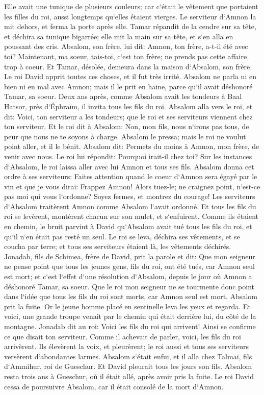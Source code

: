 \verse Elle avait une tunique de plusieurs couleurs; car c`était le vêtement que portaient les filles du roi, aussi longtemps qu`elles étaient vierges. Le serviteur d`Amnon la mit dehors, et ferma la porte après elle. 
\verse Tamar répandit de la cendre sur sa tête, et déchira sa tunique bigarrée; elle mit la main sur sa tête, et s`en alla en poussant des cris. 
\verse Absalom, son frère, lui dit: Amnon, ton frère, a-t-il été avec toi? Maintenant, ma soeur, tais-toi, c`est ton frère; ne prends pas cette affaire trop à coeur. Et Tamar, désolée, demeura dans la maison d`Absalom, son frère. 
\verse Le roi David apprit toutes ces choses, et il fut très irrité. 
\verse Absalom ne parla ni en bien ni en mal avec Amnon; mais il le prit en haine, parce qu`il avait déshonoré Tamar, sa soeur. 
\verse Deux ans après, comme Absalom avait les tondeurs à Baal Hatsor, près d`Éphraïm, il invita tous les fils du roi. 
\verse Absalom alla vers le roi, et dit: Voici, ton serviteur a les tondeurs; que le roi et ses serviteurs viennent chez ton serviteur. 
\verse Et le roi dit à Absalom: Non, mon fils, nous n`irons pas tous, de peur que nous ne te soyons à charge. Absalom le pressa; mais le roi ne voulut point aller, et il le bénit. 
\verse Absalom dit: Permets du moins à Amnon, mon frère, de venir avec nous. Le roi lui répondit: Pourquoi irait-il chez toi? 
\verse Sur les instances d`Absalom, le roi laissa aller avec lui Amnon et tous ses fils. 
\verse Absalom donna cet ordre à ses serviteurs: Faites attention quand le coeur d`Amnon sera égayé par le vin et que je vous dirai: Frappez Amnon! Alors tuez-le; ne craignez point, n`est-ce pas moi qui vous l`ordonne? Soyez fermes, et montrez du courage! 
\verse Les serviteurs d`Absalom traitèrent Amnon comme Absalom l`avait ordonné. Et tous les fils du roi se levèrent, montèrent chacun sur son mulet, et s`enfuirent. 
\verse Comme ils étaient en chemin, le bruit parvint à David qu`Absalom avait tué tous les fils du roi, et qu`il n`en était pas resté un seul. 
\verse Le roi se leva, déchira ses vêtements, et se coucha par terre; et tous ses serviteurs étaient là, les vêtements déchirés. 
\verse Jonadab, fils de Schimea, frère de David, prit la parole et dit: Que mon seigneur ne pense point que tous les jeunes gens, fils du roi, ont été tués, car Amnon seul est mort; et c`est l`effet d`une résolution d`Absalom, depuis le jour où Amnon a déshonoré Tamar, sa soeur. 
\verse Que le roi mon seigneur ne se tourmente donc point dans l`idée que tous les fils du roi sont morts, car Amnon seul est mort. 
\verse Absalom prit la fuite. Or le jeune homme placé en sentinelle leva les yeux et regarda. Et voici, une grande troupe venait par le chemin qui était derrière lui, du côté de la montagne. 
\verse Jonadab dit au roi: Voici les fils du roi qui arrivent! Ainsi se confirme ce que disait ton serviteur. 
\verse Comme il achevait de parler, voici, les fils du roi arrivèrent. Ils élevèrent la voix, et pleurèrent; le roi aussi et tous ses serviteurs versèrent d`abondantes larmes. 
\verse Absalom s`était enfui, et il alla chez Talmaï, fils d`Ammihur, roi de Gueschur. Et David pleurait tous les jours son fils. 
\verse Absalom resta trois ans à Gueschur, où il était allé, après avoir pris la fuite. 
\verse Le roi David cessa de poursuivre Absalom, car il était consolé de la mort d`Amnon. 

